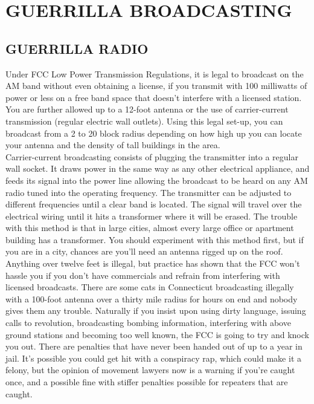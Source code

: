 \documentclass[11pt,twoside,a4paper]{book}
\begin{document}
\clearpage

\section{GUERRILLA BROADCASTING}

\subsection{GUERRILLA RADIO}

	Under FCC Low Power Transmission Regulations, it is legal to broadcast on the AM band without even obtaining a license, if you transmit with 100 milliwatts of power or less on a free band space that doesn't interfere with a licensed station. You are further allowed up to a 12-foot antenna or the use of carrier-current transmission (regular electric wall outlets). Using this legal set-up, you can broadcast from a 2 to 20 block radius depending on how high up you can locate your antenna and the density of tall buildings in the area.~\\

Carrier-current broadcasting consists of plugging the transmitter into a regular wall socket. It draws power in the same way as any other electrical appliance, and feeds its signal into the power line allowing the broadcast to be heard on any AM radio tuned into the operating frequency. The transmitter can be adjusted to different frequencies until a clear band is located. The signal will travel over the electrical wiring until it hits a transformer where it will be erased. The trouble with this method is that in large cities, almost every large office or apartment building has a transformer. You should experiment with this method first, but if you are in a city, chances are you'll need an antenna rigged up on the roof. Anything over twelve feet is illegal, but practice has shown that the FCC won't hassle you if you don't have commercials and refrain from interfering with licensed broadcasts. There are some cats in Connecticut broadcasting illegally with a 100-foot antenna over a thirty mile radius for hours on end and nobody gives them any trouble. Naturally if you insist upon using dirty language, issuing calls to revolution, broadcasting bombing information, interfering with above ground stations and becoming too well known, the FCC is going to try and knock you out. There are penalties that have never been handed out of up to a year in jail. It's possible you could get hit with a conspiracy rap, which could make it a felony, but the opinion of movement lawyers now is a warning if you're caught once, and a possible fine with stiffer penalties possible for repeaters that are caught.~\\
\end{document}
